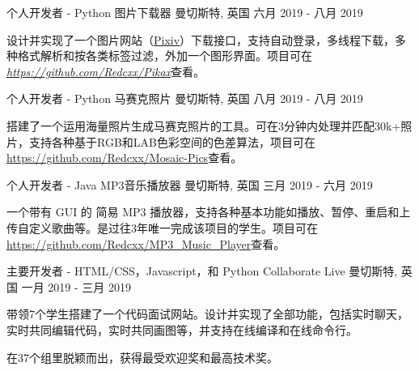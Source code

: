 \begin{cventries}
  \cventry
    {个人开发者 - Python} %
    {图片下载器} %
    {曼切斯特, 英国} %
    {六月 2019 - 八月 2019} %
    {
      \begin{cvitems} %
        \item {设计并实现了一个图片网站（\href{https://www.pixiv.net/}{Pixiv}）下载接口，支持自动登录，多线程下载，多种格式解析和按各类标签过滤，外加一个图形界面。项目可在 \href{https://github.com/Redcxx/Pikax}{\textit{https://github.com/Redcxx/Pikax}}查看。}
      \end{cvitems}
    }

  \cventry
    {个人开发者 - Python} %
    {马赛克照片} %
    {曼切斯特, 英国} %
    {八月 2019 - 八月 2019} %
    {
      \begin{cvitems} %
        \item {搭建了一个运用海量照片生成马赛克照片的工具。可在3分钟内处理并匹配30k+照片，支持各种基于RGB和LAB色彩空间的色差算法，项目可在\href{https://github.com/Redcxx/Mosaic-Pics}{https://github.com/Redcxx/Mosaic-Pics}查看。}
      \end{cvitems}
    }

  \cventry
    {个人开发者 - Java} %
    {MP3音乐播放器} %
    {曼切斯特, 英国} %
    {三月 2019 - 六月 2019} %
    {
      \begin{cvitems} %
        \item {一个带有 GUI 的 简易 MP3 播放器，支持各种基本功能如播放、暂停、重启和上传自定义歌曲等。是过往3年唯一完成该项目的学生。项目可在\href{https://github.com/Redcxx/MP3_Music_Player}{https://github.com/Redcxx/MP3\_Music\_Player}查看。}
      \end{cvitems}
    }
    
  \cventry
    {主要开发者 - HTML/CSS，Javascript，和 Python} %
    {Collaborate Live} %
    {曼切斯特, 英国} %
    {一月 2019 - 三月 2019} %
    {
      \begin{cvitems} %
        \item {带领7个学生搭建了一个代码面试网站。设计并实现了全部功能，包括实时聊天，实时共同编辑代码，实时共同画图等，并支持在线编译和在线命令行。}
        \item {在37个组里脱颖而出，获得最受欢迎奖和最高技术奖。}
      \end{cvitems}
    }
  


\end{cventries}
